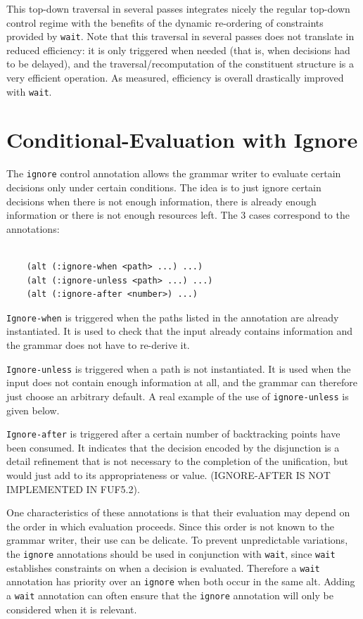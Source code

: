 \documentclass[10pt,a4paper]{report}
\begin{document}
This top-down traversal in several passes integrates nicely the regular
top-down control regime with the benefits of the dynamic re-ordering of
constraints provided by {\tt wait}.  Note that this traversal in several
passes does not translate in reduced efficiency: it is only triggered when
needed (that is, when decisions had to be delayed), and the
traversal/recomputation of the constituent structure is a very efficient
operation.  As measured, efficiency is overall drastically improved with
{\tt wait}. 



\section{Conditional-Evaluation with Ignore}

The {\tt ignore} control annotation allows the grammar writer to evaluate
certain decisions only under certain conditions. The idea is to just ignore
certain decisions when there is not enough information, there is already
enough information or there is not enough resources left.  The 3 cases
correspond to the annotations:

\begin{lstlisting}[language=Lisp]

	(alt (:ignore-when <path> ...) ...)
	(alt (:ignore-unless <path> ...) ...)
	(alt (:ignore-after <number>) ...)

\end{lstlisting}

{\tt Ignore-when} is triggered when the paths listed in the annotation are
already instantiated.   It is used to check that the input already contains
information and the grammar does not have to re-derive it.

{\tt Ignore-unless} is triggered when a path is not instantiated.
It is used when the input does not contain enough information at all, and
the grammar can therefore just choose an arbitrary default.  A real
example of the use of {\tt ignore-unless} is given below. 

{\tt Ignore-after} is triggered after a certain number of backtracking points
have been consumed.  It indicates that the decision encoded by the
disjunction is a detail refinement that is not necessary to the completion
of the unification, but would just add to its appropriateness or value.
(IGNORE-AFTER IS NOT IMPLEMENTED IN FUF5.2).

\label{wait-ignore}
One characteristics of these annotations is that their evaluation may
depend on the order in which evaluation proceeds.  Since this order is not
known to the grammar writer, their use can be delicate.  To prevent
unpredictable variations, the {\tt ignore} annotations should be used in
conjunction with {\tt wait}, since {\tt wait} establishes constraints on when a
decision is evaluated.  Therefore a {\tt wait} annotation has priority over
an {\tt ignore} when both occur in the same alt.  Adding a {\tt wait}
annotation can often ensure that the {\tt ignore} annotation will only be
considered when it is relevant.
\end{document}
